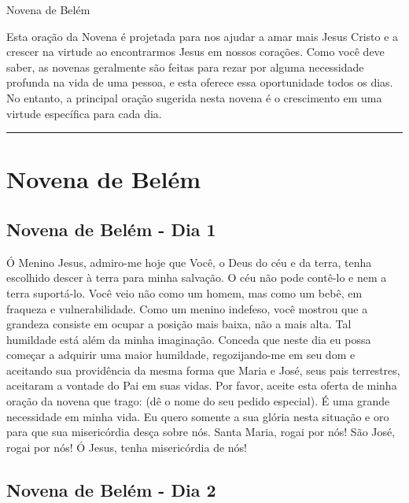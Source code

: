 \documentclass[a4paper,14pt,twoside]{extarticle} \usepackage[utf8]{inputenc}
\begin{document}
\begin{center}
  {\huge Novena de Belém}
\end{center}

Esta oração da Novena é projetada para nos ajudar a amar mais Jesus Cristo e a crescer na virtude ao encontrarmos Jesus em nossos corações. Como você deve saber, as novenas geralmente são feitas para rezar por alguma necessidade profunda na vida de uma pessoa, e esta oferece essa oportunidade todos os dias. No entanto, a principal oração sugerida nesta novena é o crescimento em uma virtude específica para cada dia.

{\centering \rule{1.0\textwidth}{0.4pt}}

\thispagestyle{empty}

\section{Novena de Belém}

\vspace{1cm}

\subsection{Novena de Belém - Dia 1}

Ó Menino Jesus, admiro-me hoje que Você, o Deus do céu e da terra, tenha escolhido descer à terra para minha salvação. O céu não pode contê-lo e nem a terra suportá-lo. Você veio não como um homem, mas como um bebê, em fraqueza e vulnerabilidade. Como um menino indefeso, você mostrou que a grandeza consiste em ocupar a posição mais baixa, não a mais alta. Tal humildade está além da minha imaginação. Conceda que neste dia eu possa começar a adquirir uma maior humildade, regozijando-me em seu dom e aceitando sua providência da mesma forma que Maria e José, seus pais terrestres, aceitaram a vontade do Pai em suas vidas. Por favor, aceite esta oferta de minha oração da novena que trago: (dê o nome do seu pedido especial). É uma grande necessidade em minha vida. Eu quero somente a sua glória nesta situação e oro para que sua misericórdia desça sobre nós. Santa Maria, rogai por nós! São José, rogai por nós! Ó Jesus, tenha misericórdia de nós!


\subsection{Novena de Belém - Dia 2}
\end{document}
